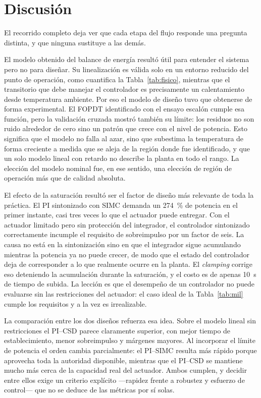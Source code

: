\documentclass[conference,a4paper,10pt]{IEEEtran}
\begin{document}
\section{Discusión}

El recorrido completo deja ver que cada etapa del flujo responde una pregunta distinta, y que
ninguna sustituye a las demás.

El modelo obtenido del balance de energía resultó útil para entender el sistema pero no para
diseñar. Su linealización es válida solo en un entorno reducido del punto de operación, como
cuantifica la Tabla~\ref{tab:fisico}, mientras que el transitorio que debe manejar el controlador
es precisamente un calentamiento desde temperatura ambiente. Por eso el modelo de diseño tuvo que
obtenerse de forma experimental. El FOPDT identificado con el ensayo escalón cumple
esa función, pero la validación cruzada mostró también su límite: los residuos no son ruido
alrededor de cero sino un patrón que crece con el nivel de potencia. Esto significa que el modelo no
falla al azar, sino que subestima la temperatura de forma creciente a medida que se aleja de la
región donde fue identificado, y que un solo modelo lineal con retardo no describe la planta en todo
el rango. La elección del modelo nominal fue, en ese sentido, una elección de región de operación
más que de calidad absoluta.

El efecto de la saturación resultó ser el factor de diseño más relevante de toda la práctica. El PI
sintonizado con SIMC demanda un \SI{274}{\percent} de potencia en el primer instante, casi tres
veces lo que el actuador puede entregar. Con el actuador limitado pero sin protección del
integrador, el controlador sintonizado correctamente incumple el requisito de sobreimpulso por un
factor de seis. La causa no está en la sintonización sino en que el integrador sigue acumulando
mientras la potencia ya no puede crecer, de modo que el estado del controlador deja de corresponder
a lo que realmente ocurre en la planta. El \emph{clamping} corrige eso deteniendo la acumulación
durante la saturación, y el costo es de apenas \SI{10}{\second} de tiempo de subida. La lección es
que el desempeño de un controlador no puede evaluarse sin las restricciones del actuador: el caso
ideal de la Tabla~\ref{tab:mil} cumple los requisitos y a la vez es irrealizable.

La comparación entre los dos diseños refuerza esa idea. Sobre el modelo lineal sin restricciones el
PI--CSD parece claramente superior, con mejor tiempo de establecimiento, menor sobreimpulso y
márgenes mayores. Al incorporar el límite de potencia el orden cambia parcialmente: el PI--SIMC
resulta más rápido porque aprovecha toda la autoridad disponible, mientras que el PI--CSD se
mantiene mucho más cerca de la capacidad real del actuador. Ambos cumplen, y decidir entre ellos
exige un criterio explícito ---rapidez frente a robustez y esfuerzo de control--- que no se deduce
de las métricas por sí solas.
\end{document}
